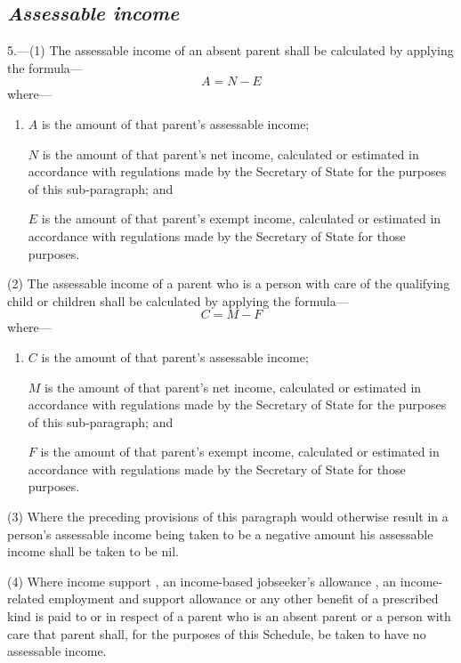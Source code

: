\documentclass[12pt,a4paper]{article}
\begin{document}

\subsection*{\itshape Assessable income}

5.---(1) The assessable income of an absent parent shall be calculated by applying the formula—
\[
A = N - E
\]
where—
\begin{enumerate}\item[]
    $A$ is the amount of that parent’s assessable income;

    $N$ is the amount of that parent’s net income, calculated or estimated in accordance with regulations made by the Secretary of State for the purposes of this sub-paragraph; and

    $E$ is the amount of that parent’s exempt income, calculated or estimated in accordance with regulations made by the Secretary of State for those purposes. 
\end{enumerate}

(2) The assessable income of a parent who is a person with care of the qualifying child or children shall be calculated by applying the formula—
\[
C = M - F
\]
where—
\begin{enumerate}\item[]
    $C$ is the amount of that parent’s assessable income;

    $M$ is the amount of that parent’s net income, calculated or estimated in accordance with regulations made by the Secretary of State for the purposes of this sub-paragraph; and

    $F$ is the amount of that parent’s exempt income, calculated or estimated in accordance with regulations made by the Secretary of State for those purposes. 
\end{enumerate}

(3) Where the preceding provisions of this paragraph would otherwise result in a person’s assessable income being taken to be a negative amount his assessable income shall be taken to be nil.

(4) Where income support%
, an income-based jobseeker’s allowance%
 , an income-related employment and support allowance  %
 or any other benefit of a prescribed kind is paid to or in respect of a parent who is an absent parent or a person with care that parent shall, for the purposes of this Schedule, be taken to have no assessable income.
\end{document}
